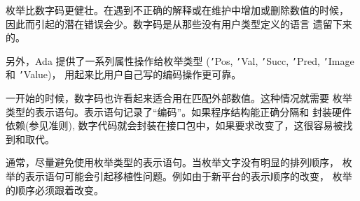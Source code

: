 \begin{blockindent}
枚举比数字码更健壮。在遇到不正确的解释或在维护中增加或删除数值的时候，
因此而引起的潜在错误会少。数字码是从那些没有用户类型定义的语言
遗留下来的。

另外，Ada 提供了一系列属性操作给枚举类型 (\texttt{'}Pos, \texttt{'}Val,
\texttt{'}Succ, \texttt{'}Pred, \texttt{'}Image 和 \texttt{'}Value)，
用起来比用户自己写的编码操作更可靠。

一开始的时候，数字码也许看起来适合用在匹配外部数值。这种情况就需要
枚举类型的表示语句。表示语句记录了``编码''。如果程序结构能正确分隔和
封装硬件依赖(参见准则\cite{c:portability:fundamental:encapsulating}),
数字代码就会封装在接口包中，如果要求改变了，这很容易被找到和取代。

通常，尽量避免使用枚举类型的表示语句。当枚举文字没有明显的排列顺序，
枚举的表示语句可能会引起移植性问题。例如由于新平台的表示顺序的改变，
枚举的顺序必须跟着改变。
\end{blockindent}
